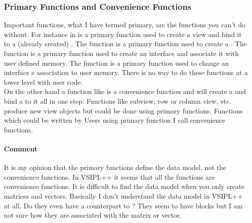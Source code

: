 \subsubsection{Primary Functions and Convenience Functions}
Important functions, what I have termed primary, are the functions you can't do without. For instance in \cvl{}  is a primary function used to create a view and bind it to a (already created) \blk{}. The function  is a primary function used to create a \blk{}. The function  is a primary function used to create an interface \blk{} and associate it with user defined memory. The function  is a primary function used to change an interface \blk{}s association to user memory.  There is no way to do these functions at a lower level with user code.
\\[6pt]
On the other hand a function like  is a convenience function and will create a \blk{} and bind a \vw{} to it all in one step.  Functions like subview, row or column view, etc.  produce new view objects but could be done using primary functions. Functions which could be written by Users using primary function I call convenience functions.
\paragraph{Comment} It is my opinion that the primary functions define the data model, not the convenience functions.  In VSIPL++ it seems that all the functions are convenience functions.  It is difficult to find the data model when you only create matrices and vectors. Basically I don't understand the data model in VSIPL++ at all.  Do they even have a counterpart to ?  They seem to have blocks but I am not sure how they are associated with the matrix or vector.
%